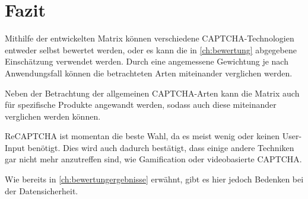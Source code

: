 \chapter{Fazit}

Mithilfe der entwickelten Matrix können verschiedene CAPTCHA-Technologien entweder selbst bewertet werden,
oder es kann die in \autoref{ch:bewertung} abgegebene Einschätzung verwendet werden.
Durch eine angemessene Gewichtung je nach Anwendungsfall können die betrachteten Arten miteinander verglichen werden.

Neben der Betrachtung der allgemeinen CAPTCHA-Arten kann die Matrix auch für spezifische Produkte angewandt werden,
sodass auch diese miteinander verglichen werden können.

ReCAPTCHA ist momentan die beste Wahl, da es meist wenig oder keinen User-Input benötigt.
Dies wird auch dadurch bestätigt, dass einige andere Techniken gar nicht mehr anzutreffen sind,
wie Gamification oder videobasierte CAPTCHA. 

Wie bereits in \autoref{ch:bewertungergebnisse} erwähnt, gibt es hier jedoch Bedenken bei der Datensicherheit.


